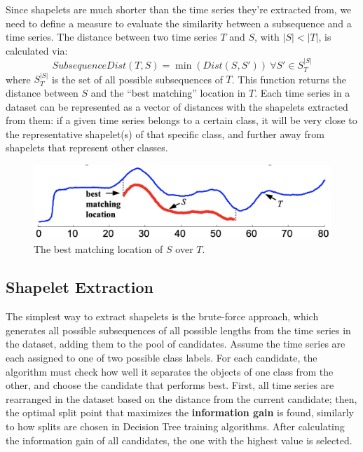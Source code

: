 Since shapelets are much shorter than the time series they're extracted from, we need to define a measure to evaluate the similarity between a subsequence and a time series. The distance between two time series $T$ and $S$, with $|S| < |T|$, is calculated via:
\begin{equation*}
    \textit{SubsequenceDist}(T,S) = \min(\textit{Dist}(S,S')) \ \forall S' \in S_T^{|S|}
\end{equation*}
where $S_T^{|S|}$ is the set of all possible subsequences of $T$. This function returns the distance between $S$ and the ``best matching'' location in $T$. Each time series in a dataset can be represented as a vector of distances with the shapelets extracted from them: if a given time series belongs to a certain class, it will be very close to the representative shapelet(s) of that specific class, and further away from shapelets that represent other classes.

\begin{figure}[ht]
    \centering
    \includegraphics[width=0.5\linewidth]{img/subsequencedist.png}
    \caption{The best matching location of $S$ over $T$.}
    \label{fig:subseq-dist}
\end{figure}

\subsection{Shapelet Extraction}

The simplest way to extract shapelets is the brute-force approach, which generates all possible subsequences of all possible lengths from the time series in the dataset, adding them to the pool of candidates. Assume the time series are each assigned to one of two possible class labels. For each candidate, the algorithm must check how well it separates the objects of one class from the other, and choose the candidate that performs best. First, all time series are rearranged in the dataset based on the distance from the current candidate; then, the optimal split point that maximizes the \textbf{information gain} is found, similarly to how splits are chosen in Decision Tree training algorithms. After calculating the information gain of all candidates, the one with the highest value is selected.

